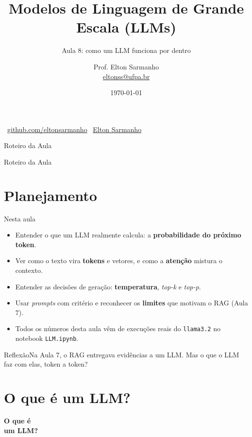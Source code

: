 \documentclass[aspectratio=169]{beamer}
\title[Inteligência Artificial]{Modelos de Linguagem de Grande Escala (LLMs)}
\subtitle{Aula 8: como um LLM funciona por dentro}
\author[Elton Sarmanho]{
    Prof. Elton Sarmanho\inst{1}\\
    \footnotesize \href{mailto:eltonss@ufpa.br}{eltonss@ufpa.br}
}
\institute[UFPA]{
    \inst{1} Faculdade de Sistemas de Informação - UFPA Campus Cametá
}
\date{\today}
\newcommand{\reflexao}[1]{\begin{alertblock}{Reflexão}#1\end{alertblock}}
\begin{document}
\begin{frame}
    \titlepage
    \begin{center}
        \tiny {}\ \href{https://github.com/eltonsarmanho}{github.com/eltonsarmanho} \quad
        \ \href{https://www.linkedin.com/in/elton-sarmanho-836553185/}{Elton Sarmanho}
    \end{center}
\end{frame}

\begin{frame}{Roteiro da Aula}
    \tableofcontents[sections={1-4}]
\end{frame}

\begin{frame}{Roteiro da Aula}
   \tableofcontents[sections={5-9}]
\end{frame}

\section{Planejamento}
\begin{frame}{Nesta aula}
    \begin{itemize}
        \item Entender o que um LLM realmente calcula: a \textbf{probabilidade do próximo token}.
        \item Ver como o texto vira \textbf{tokens} e vetores, e como a \textbf{atenção} mistura o contexto.
        \item Entender as decisões de geração: \textbf{temperatura}, \textit{top-k} e \textit{top-p}.
        \item Usar \textit{prompts} com critério e reconhecer os \textbf{limites} que motivam o RAG (Aula 7).
        \item Todos os números desta aula vêm de execuções reais do \texttt{llama3.2} no notebook \texttt{LLM.ipynb}.
    \end{itemize}
    \reflexao{Na Aula 7, o RAG entregava evidências a um LLM. Mas o que o LLM faz com elas, token a token?}
\end{frame}

\section{O que é um LLM?}
\begin{frame}
\centering\Huge\textbf{O que é\\um LLM?}
\end{frame}
\end{document}

